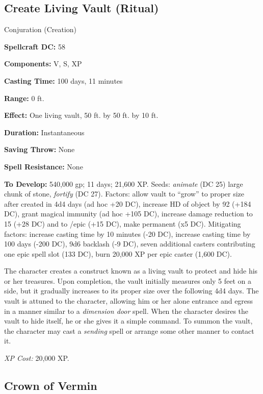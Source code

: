 \documentclass{article}
\begin{document}
\vspace{12pt}
\subsection*{Create Living Vault (Ritual)}

Conjuration (Creation) 

\textbf{Spellcraft DC:} 58 

\textbf{Components:} V, S, XP 

\textbf{Casting Time:} 100 days, 11 minutes 

\textbf{Range:} 0 ft. 

\textbf{Effect:} One living vault, 50 ft. by 50 ft. by 10 ft. 

\textbf{Duration:} Instantaneous 

\textbf{Saving Throw:} None 

\textbf{Spell Resistance:} None 

\textbf{To Develop:} 540,000 gp; 11 days; 21,600 XP. Seeds: \textit{animate }(DC 
25) large chunk of stone, \textit{fortify }(DC 27). Factors: allow vault to ``grow'' 
to proper size after created in 4d4 days (ad hoc +20 DC), increase HD of object 
by 92 (+184 DC), grant magical immunity (ad hoc +105 DC), increase damage reduction 
to 15 (+28 DC) and to /epic (+15 DC), make permanent (x5 DC). Mitigating factors: 
increase casting time by 10 minutes (-20 DC), increase casting time by 100 days 
(-200 DC), 9d6 backlash (-9 DC), seven additional casters contributing one epic 
spell slot (\-{}133 DC), burn 20,000 XP per epic caster (\-{}1,600 DC). 

The character creates a construct known as a living vault to protect and hide his 
or her treasures. Upon completion, the vault initially measures only 5 feet on 
a side, but it gradually increases to its proper size over the following 4d4 days. 
The vault is attuned to the character, allowing him or her alone entrance and egress 
in a manner similar to a \textit{dimension door }spell. When the character desires 
the vault to hide itself, he or she gives it a simple command. To summon the vault, 
the character may cast a \textit{sending }spell or arrange some other manner to 
contact it. 

\textit{XP Cost: }20,000 XP. 

\vspace{12pt}
\subsection*{Crown of Vermin }
\end{document}
